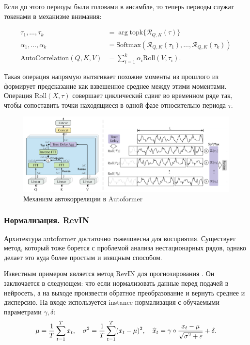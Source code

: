 \documentclass[12pt,fleqn]{article}
\begin{document}
Если до этого периоды были головами в ансамбле, то теперь периоды служат токенами в механизме внимания:

\begin{align}
\tau_1,\ldots,\tau_k&=\arg\text{topk}\{\mathcal{R}_{Q,K}(\tau)\}\\
\alpha_1,\ldots,\alpha_k&=\text{Softmax}(\mathcal{R}_{Q,K}(\tau_1),\ldots,\mathcal{R}_{Q,K}(\tau_k))\\
\text{AutoCorrelation}(Q,K,V)&=\sum_{i=1}^k\alpha_i\text{Roll}(V,\tau_i).
\end{align}

Такая операция напрямую вытягивает похожие моменты из прошлого из формирует предсказание как взвешенное среднее между этими моментами. Операция $\text{Roll}(X,\tau)$ совершает циклический сдвиг во временном ряде так, чтобы сопоставить точки находящиеся в одной фазе относительно периода $\tau$.

\begin{figure}[!htb]
    \centering
    \includegraphics[width=0.5\linewidth]{notes.assets/image-20241018013325489.png}
    \caption{Механизм автокорреляции в Autoformer}
    \label{fig:autocorrelation}
\end{figure}

\subsubsection{Нормализация. RevIN}

Архитектура autoformer достаточно тяжеловесна для восприятия. Существует метод, который тоже борется с проблемой анализа нестационарных рядов, однако делает это куда более простым и изящным способом.

Известным примером является метод RevIN для прогнозирования \cite{revin}. Он заключается в следующем: что если нормализовать данные перед подачей в нейросеть, а на выходе произвести обратное преобразование и вернуть среднее и дисперсию. На входе используется instance нормализация с обучаемыми параметрами $\gamma,\delta$:
$$
\mu={1\over T}\sum_{t=1}^T x_t,\quad \sigma^2={1\over T}\sum_{t=1}^T(x_t-\mu)^2,\quad \widehat x_t=\gamma\circ{x_t-\mu\over\sqrt{\sigma^2+\varepsilon}}+\delta.
$$
\end{document}
